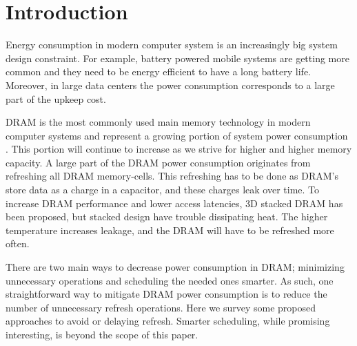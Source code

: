 \section{Introduction}
\label{sec:int}

Energy consumption in modern computer system is an increasingly big system design constraint. For example, battery powered mobile systems are getting more common and they need to be energy efficient to have a long battery life. Moreover, in large data centers the power consumption corresponds to a large part of the upkeep cost. 

DRAM is the most commonly used main memory technology in modern computer systems and represent a growing portion of system power consumption \cite{exascale}. This portion will continue to increase as we strive for higher and higher memory capacity. A large part of the DRAM power consumption originates from refreshing all DRAM memory-cells. This refreshing has to be done as DRAM's store data as a charge in a capacitor, and these charges leak over time. To increase DRAM performance and lower access latencies, 3D stacked DRAM has been proposed, but stacked design have trouble dissipating heat. The higher temperature increases leakage, and the DRAM will have to be refreshed more often.

There are two main ways to decrease power consumption in DRAM; minimizing unnecessary operations and scheduling the needed ones smarter. As such, one straightforward way to mitigate DRAM power consumption is to reduce the number of unnecessary refresh operations. Here we survey some proposed approaches to avoid or delaying refresh. Smarter scheduling, while promising interesting, is beyond the scope of this paper.